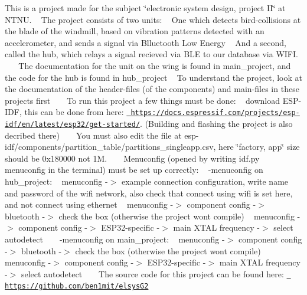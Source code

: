 This is a project made for the subject \char`\"{}electronic system design, project I\+I\char`\"{} at N\+T\+NU. ~\newline
The project consists of two units\+: ~\newline
One which detects bird-\/collisions at the blade of the windmill, based on vibration patterns detected with an accelerometer, and sends a signal via Blluetooth Low Energy ~\newline
And a second, called the hub, which relays a signal recieved via B\+LE to our database via W\+I\+FI. ~\newline
 ~\newline
 The documentation for the unit on the wing is found in main\+\_\+project, and the code for the hub is found in hub\+\_\+project ~\newline
To understand the project, look at the documentation of the header-\/files (of the components) and main-\/files in these projects first ~\newline
 ~\newline
 To run this project a few things must be done\+: ~\newline
download E\+S\+P-\/\+I\+DF, this can be done from here\+: \href{https://docs.espressif.com/projects/esp-idf/en/latest/esp32/get-started/}{\texttt{ https\+://docs.\+espressif.\+com/projects/esp-\/idf/en/latest/esp32/get-\/started/}}. (Building and flashing the project is also decribed there) ~\newline
 ~\newline
 You must also edit the file at esp-\/idf/components/partition\+\_\+table/partitions\+\_\+singleapp.\+csv, here \char`\"{}factory, app\char`\"{} size should be 0x180000 not 1M. ~\newline
 ~\newline
 Menuconfig (opened by writing idf.\+py menuconfig in the terminal) must be set up correctly\+: ~\newline
 -\/menuconfig on hub\+\_\+project\+: ~\newline
menuconfig -\/$>$ example connection configuration, write name and password of the wifi network, also check that connect using wifi is set here, and not connect using ethernet ~\newline
menuconfig -\/$>$ component config -\/$>$ bluetooth -\/$>$ check the box (otherwise the project wont compile) ~\newline
menuconfig -\/$>$ component config -\/$>$ E\+S\+P32-\/specific -\/$>$ main X\+T\+AL frequency -\/$>$ select autodetect ~\newline
 ~\newline
 -\/menuconfig on main\+\_\+project\+: ~\newline
menuconfig -\/$>$ component config -\/$>$ bluetooth -\/$>$ check the box (otherwise the project wont compile) ~\newline
menuconfig -\/$>$ component config -\/$>$ E\+S\+P32-\/specific -\/$>$ main X\+T\+AL frequency -\/$>$ select autodetect ~\newline
 ~\newline
 The source code for this project can be found here\+: \href{https://github.com/ben1mit/elsysG2}{\texttt{ https\+://github.\+com/ben1mit/elsys\+G2}} ~\newline
